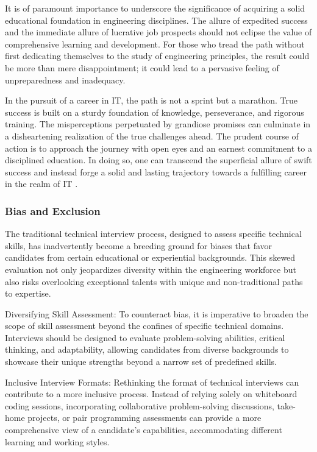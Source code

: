 \documentclass[
    a4paper, %
    10pt, %
    unnumberedsections, %
    twoside, %
]{LTJournalArticle}
\begin{document}
It is of paramount importance to underscore the significance of acquiring a solid educational foundation in engineering disciplines. The allure of expedited success and the immediate allure of lucrative job prospects should not eclipse the value of comprehensive learning and development. For those who tread the path without first dedicating themselves to the study of engineering principles, the result could be more than mere disappointment; it could lead to a pervasive feeling of unpreparedness and inadequacy.

In the pursuit of a career in IT, the path is not a sprint but a marathon. True success is built on a sturdy foundation of knowledge, perseverance, and rigorous training. The misperceptions perpetuated by grandiose promises can culminate in a disheartening realization of the true challenges ahead. The prudent course of action is to approach the journey with open eyes and an earnest commitment to a disciplined education. In doing so, one can transcend the superficial allure of swift success and instead forge a solid and lasting trajectory towards a fulfilling career in the realm of IT \cite{tetlock2007illusion}.











\subsubsection*{Bias and Exclusion}

The traditional technical interview process, designed to assess specific technical skills, has inadvertently become a breeding ground for biases that favor candidates from certain educational or experiential backgrounds. This skewed evaluation not only jeopardizes diversity within the engineering workforce but also risks overlooking exceptional talents with unique and non-traditional paths to expertise.

Diversifying Skill Assessment:
To counteract bias, it is imperative to broaden the scope of skill assessment beyond the confines of specific technical domains. Interviews should be designed to evaluate problem-solving abilities, critical thinking, and adaptability, allowing candidates from diverse backgrounds to showcase their unique strengths beyond a narrow set of predefined skills.

Inclusive Interview Formats:
Rethinking the format of technical interviews can contribute to a more inclusive process. Instead of relying solely on whiteboard coding sessions, incorporating collaborative problem-solving discussions, take-home projects, or pair programming assessments can provide a more comprehensive view of a candidate's capabilities, accommodating different learning and working styles.
\end{document}
